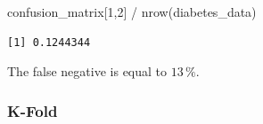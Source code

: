 \documentclass[
]{article}
\newenvironment{Shaded}{\begin{snugshade}}{\end{snugshade}}
\newcommand{\DecValTok}[1]{\textcolor[rgb]{0.00,0.00,0.81}{#1}}
\newcommand{\FunctionTok}[1]{\textcolor[rgb]{0.00,0.00,0.00}{#1}}
\newcommand{\NormalTok}[1]{#1}
\newcommand{\SpecialCharTok}[1]{\textcolor[rgb]{0.00,0.00,0.00}{#1}}
\begin{document}
\begin{Shaded}
\begin{Highlighting}[]
\NormalTok{confusion\_matrix[}\DecValTok{1}\NormalTok{,}\DecValTok{2}\NormalTok{] }\SpecialCharTok{/} \FunctionTok{nrow}\NormalTok{(diabetes\_data)}
\end{Highlighting}
\end{Shaded}

\begin{verbatim}
[1] 0.1244344
\end{verbatim}

The false negative is equal to \(13\,\%\).

\hypertarget{k-fold}{%
\subsubsection{K-Fold}\label{k-fold}}
\end{document}
